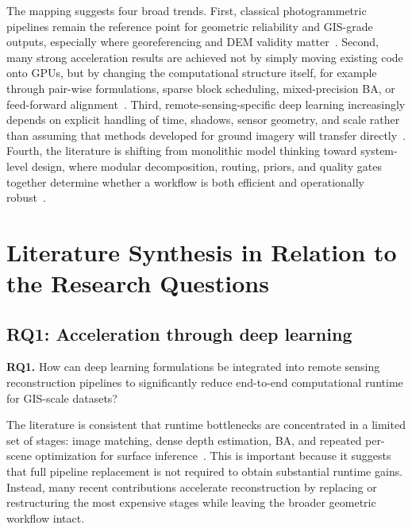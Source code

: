 The mapping suggests four broad trends. First, classical photogrammetric pipelines remain the reference point for geometric reliability and GIS-grade outputs, especially where georeferencing and DEM validity matter~\cite{Schonberger2016,Schonberger2016MVS,deFranchis2014}. Second, many strong acceleration results are achieved not by simply moving existing code onto GPUs, but by changing the computational structure itself, for example through pair-wise formulations, sparse block scheduling, mixed-precision BA, or feed-forward alignment~\cite{Li2025FastMap,Zhong2025InstantSfM,Safari2025,Light3RSfM2025}. Third, remote-sensing-specific deep learning increasingly depends on explicit handling of time, shadows, sensor geometry, and scale rather than assuming that methods developed for ground imagery will transfer directly~\cite{Masquil2026,SatDepth2025,SEO2025,ShadowGS2026}. Fourth, the literature is shifting from monolithic model thinking toward system-level design, where modular decomposition, routing, priors, and quality gates together determine whether a workflow is both efficient and operationally robust~\cite{MVSR3D2025,SMoEStereo2025,MoE3D2026,Elias2025}.

\section{Literature Synthesis in Relation to the Research Questions}

\subsection{RQ1: Acceleration through deep learning}

\textbf{RQ1.} How can deep learning formulations be integrated into remote sensing reconstruction pipelines to significantly reduce end-to-end computational runtime for GIS-scale datasets?

The literature is consistent that runtime bottlenecks are concentrated in a limited set of stages: image matching, dense depth estimation, BA, and repeated per-scene optimization for surface inference~\cite{Schonberger2016,Schonberger2016MVS,Galliani2015}. This is important because it suggests that full pipeline replacement is not required to obtain substantial runtime gains. Instead, many recent contributions accelerate reconstruction by replacing or restructuring the most expensive stages while leaving the broader geometric workflow intact.

